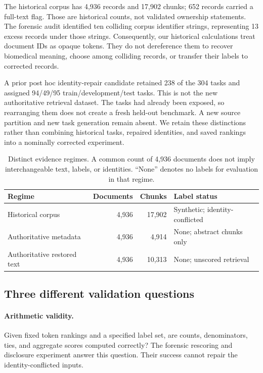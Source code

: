 \documentclass{article}
\begin{document}
The historical corpus has 4,936 records and 17,902 chunks; 652 records carried a full-text flag. Those are historical counts, not validated ownership statements. The forensic audit identified ten colliding corpus identifier strings, representing 13 excess records under those strings. Consequently, our historical calculations treat document IDs as opaque tokens. They do not dereference them to recover biomedical meaning, choose among colliding records, or transfer their labels to corrected records.

A prior post hoc identity-repair candidate retained 238 of the 304 tasks and assigned 94/49/95 train/development/test tasks. This is not the new authoritative retrieval dataset. The tasks had already been exposed, so rearranging them does not create a fresh held-out benchmark. A new source partition and new task generation remain absent. We retain these distinctions rather than combining historical tasks, repaired identities, and saved rankings into a nominally corrected experiment.

\begin{table}[t]
\centering
\caption{Distinct evidence regimes. A common count of 4,936 documents does not imply interchangeable text, labels, or identities. ``None'' denotes no labels for evaluation in that regime.}
\label{tab:regimes}
\begin{tabular}{@{}lrrl@{}}
\toprule
Regime & Documents & Chunks & Label status \\
\midrule
Historical corpus & 4,936 & 17,902 & Synthetic; identity-conflicted \\
Authoritative metadata & 4,936 & 4,914 & None; abstract chunks only \\
Authoritative restored text & 4,936 & 10,313 & None; unscored retrieval \\
\bottomrule
\end{tabular}
\end{table}

\subsection{Three different validation questions}
\paragraph{Arithmetic validity.}
Given fixed token rankings and a specified label set, are counts, denominators, ties, and aggregate scores computed correctly? The forensic rescoring and disclosure experiment answer this question. Their success cannot repair the identity-conflicted inputs.
\end{document}

